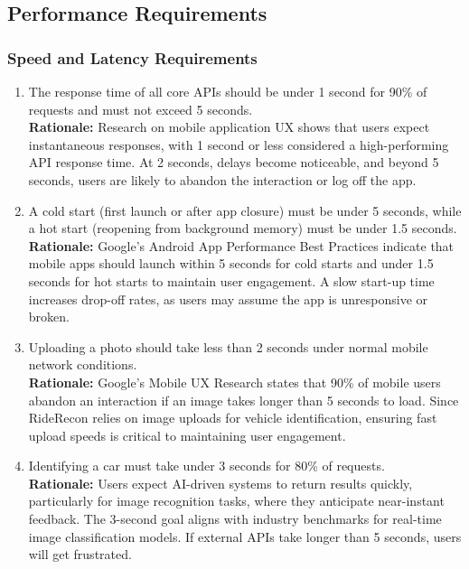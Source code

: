 \documentclass[]{article}
\begin{document}

\subsection{Performance Requirements}
\label{sub:performance_requirements}

\subsubsection{Speed and Latency Requirements}
\label{ssub:speed_and_latency_requirements}
\begin{enumerate}[label={PR-SL\arabic*.}]
    \item The response time of all core APIs should be under 1 second for 90\% of requests and must not exceed 5 seconds.\\ 
	\textbf{Rationale:} Research on mobile application UX shows that users expect instantaneous responses, with 1 second or less considered a high-performing API response time. At 2 seconds, delays become noticeable, and beyond 5 seconds, users are likely to abandon the interaction or log off the app.
	\item A cold start (first launch or after app closure) must be under 5 seconds, while a hot start (reopening from background memory) must be under 1.5 seconds.\\
	\textbf{Rationale:} Google’s Android App Performance Best Practices indicate that mobile apps should launch within 5 seconds for cold starts and under 1.5 seconds for hot starts to maintain user engagement. A slow start-up time increases drop-off rates, as users may assume the app is unresponsive or broken.
	\item Uploading a photo should take less than 2 seconds under normal mobile network conditions.\\
	\textbf{Rationale:} Google’s Mobile UX Research states that 90\% of mobile users abandon an interaction if an image takes longer than 5 seconds to load. Since RideRecon relies on image uploads for vehicle identification, ensuring fast upload speeds is critical to maintaining user engagement.
	\item Identifying a car must take under 3 seconds for 80\% of requests.\\
	\textbf{Rationale:} Users expect AI-driven systems to return results quickly, particularly for image recognition tasks, where they anticipate near-instant feedback. The 3-second goal aligns with industry benchmarks for real-time image classification models. If external APIs take longer than 5 seconds, users will get frustrated.
\end{enumerate}
\end{document}
